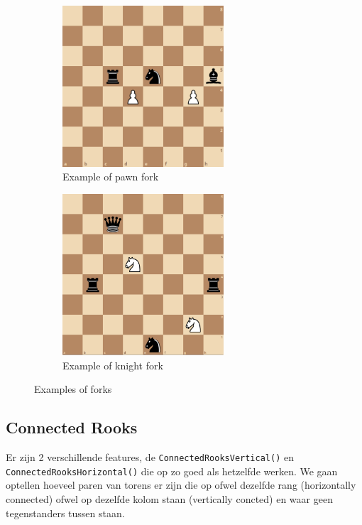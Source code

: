 \documentclass[a4paper,openany]{uantwerpenassignment}
\newcommand{\codeword}[1]{
    \colorbox{code}{\texttt{\textcolor{codetext}{#1}}}
}
\begin{document}
\begin{figure}[h]
    \centering
    \begin{subfigure}{.4\textwidth}
        \includegraphics[width=170pt]{images/pawnFork.png}
        \caption{Example of pawn fork}
        \label{fig:pawnFork}
    \end{subfigure}
    \begin{subfigure}{.4\textwidth}
        \includegraphics[width=170pt]{images/knightFork.png}
        \caption{Example of knight fork}
        \label{fig:knightFork}
    \end{subfigure}
    \caption{Examples of forks}
\end{figure}

\subsection{Connected Rooks}
Er zijn 2 verschillende features, de \codeword{ConnectedRooksVertical()} en \codeword{ConnectedRooksHorizontal()} die op zo goed als hetzelfde werken. We gaan optellen hoeveel paren van torens er zijn die op ofwel dezelfde rang (horizontally connected) ofwel op dezelfde kolom staan (vertically concted) en waar geen tegenstanders tussen staan.
\end{document}
